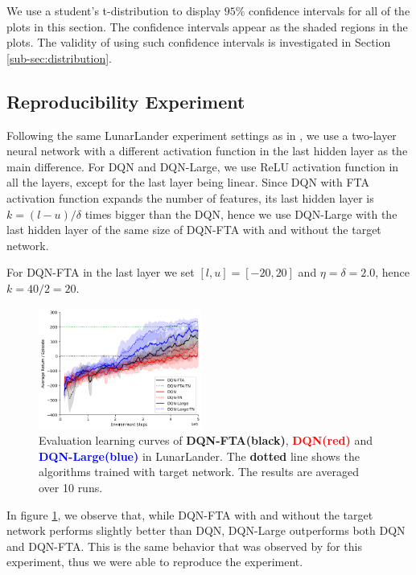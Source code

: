 \documentclass{article}
\begin{document}
We use a student's t-distribution to display $95\%$ confidence intervals for all of the plots in this section. 
The confidence intervals appear as the shaded regions in the plots.
The validity of using such confidence intervals is investigated in Section \ref{sub-sec:distribution}.


\subsection{Reproducibility Experiment} \label{sub-sec:reproduc experiments}
Following the same LunarLander experiment settings as in \cite{pan2019fuzzy}, we use a two-layer neural network with a different activation function in the last hidden layer as the main difference. 
For DQN and DQN-Large, we use ReLU activation function in all the layers, except for the last layer being linear.
Since DQN with FTA activation function expands the number of features, its last hidden layer is $k = (l-u)/\delta$ times bigger than the DQN, 
hence we use DQN-Large with the last hidden layer of the same size of DQN-FTA with and without the target network.

For DQN-FTA in the last layer we set $[l, u] = [-20, 20]$ and $\eta = \delta = 2.0$, hence $k = 40/2 = 20$.


\begin{figure}[h]
    \centering
    \includegraphics[height=4cm]{ftavrelu.png}
    \caption{Evaluation learning curves of {\bf DQN-FTA(black)}, {\textcolor{red} {\bf DQN(red)}} and {\textcolor{blue} {\bf DQN-Large(blue)}} in LunarLander. 
    The {\bf dotted} line shows the algorithms trained with target network. The results are averaged over 10 runs.}
    \label{fig:ftavrelu}
\end{figure}


In figure \ref{fig:ftavrelu}, we observe that, while DQN-FTA with and without the target network performs slightly better than DQN, DQN-Large outperforms both DQN and DQN-FTA.
This is the same behavior that was observed by \cite[]{pan2019fuzzy} for this experiment, thus we were able to reproduce the experiment.
\end{document}

